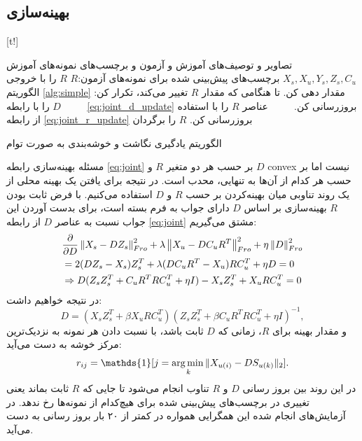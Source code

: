 \subsection{بهینه‌سازی}\label{jeac_opt}

[t!]
	\begin{enumerate}[label={\arabic*},itemsep=.1em, parsep=.1em]
 تصاویر و توصیف‌های آموزش و آزمون و برچسب‌های نمونه‌های آموزش $X_s, X_u, Y_s, Z_s, C_u$
 برچسب‌های پیش‌بینی شده برای نمونه‌های آزمون:$R$
 $R$ را با خروجی الگوریتم \ref{alg:simple} مقدار دهی کن.
 تا هنگامی که مقدار $R$ تغییر می‌کند،  تکرار کن:
 $\qquad$  $D$ را با رابطه \eqref{eq:joint_d_update} بروزرسانی کن.
 $\qquad$ عناصر $R$ را با استفاده از رابطه \eqref{eq:joint_r_update} بروزرسانی کن.
 $R$ را برگردان
\end{enumerate}
\caption{الگوریتم یادگیری نگاشت و خوشه‌بندی به صورت توام}
\label{alg:jeac}

مسئله بهینه‌سازی رابطه \eqref{eq:joint} بر حسب هر دو متغیر $R$ و $D$
\gls{convex}  نیست اما بر حسب هر کدام از آن‌ها به تنهایی، محدب است. در نتیجه برای یافتن یک بهینه محلی از یک روند تناوبی میان بهینه‌کردن بر حسب $R$ و $D$ استفاده می‌کنیم.
با فرض ثابت بودن $R$ بهینه‌سازی بر اساس $D$ دارای جواب به فرم بسته است، برای بدست آوردن این جواب نسبت به عناصر $D$ از رابطه \eqref{eq:joint} مشتق می‌گیریم:
\begin{align*}
& \frac{\partial}{\partial D}\left \lVert X_s - D Z_s \right \rVert_{Fro}^2  + \lambda \left \lVert X_u - D C_u R^T  \right \rVert_{Fro}^2 + \eta \left \lVert D \right \rVert_{Fro}^2 \\
& =2 (DZ_s - X_s)Z_s^T + \lambda (DC_uR^T - X_u) RC_u^T + \eta D = 0 \\
& \Rightarrow D(Z_sZ_s^T + C_uR^TRC_u^T + \eta I) - X_sZ_s^T + X_uRC_u^T  = 0
\end{align*}
در نتیجه خواهیم داشت:
\begin{equation} \label{eq:joint_d_update}
  D = (X_s Z_s^T + \beta X_u R C_u^T) (Z_s Z_s^T + \beta C_u R^T R C_u^T  + \eta I)^{-1},
\end{equation}
و مقدار بهینه برای $R$، زمانی که $D$ ثابت باشد، با نسبت دادن هر نمونه به نزدیک‌ترین مرکز خوشه به دست می‌آید:
\begin{equation} \label{eq:joint_r_update}
  r_{ij} = \mathds{1}[j = \argmin_{k} \lVert X_{u(i)} - D S_{u(k)} \rVert_2 ].
\end{equation}
در این روند بین بروز رسانی $D$ و $R$ تناوب انجام می‌شود تا جایی که $R$ ثابت بماند یعنی تغییری در برچسب‌های پیش‌بینی شده برای هیچ‌کدام از نمونه‌ها رخ ندهد. در آزمایش‌های انجام شده این همگرایی همواره در کمتر از ۲۰ بار بروز رسانی به دست می‌آید.

